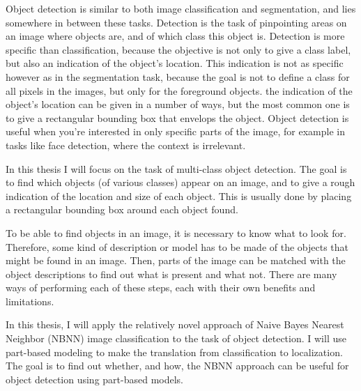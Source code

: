 \documentclass[a4paper,10pt]{article}
\begin{document}
Object detection is similar to both image classification and segmentation, and lies somewhere in between these tasks. Detection is the task of pinpointing areas on an image where objects are, and of which class this object is. Detection is more specific than classification, because the objective is not only to give a class label, but also an indication of the object's location. This indication is not as specific however as in the segmentation task, because the goal is not to define a class for all pixels in the images, but only for the foreground objects. the indication of the object's location can be given in a number of ways, but the most common one is to give a rectangular bounding box that envelops the object. Object detection is useful when you're interested in only specific parts of the image, for example in tasks like face detection, where the context is irrelevant. \todo{}


In this thesis I will focus on the task of multi-class object detection. The goal is to find which objects (of various classes) appear on an image, and to give a rough indication of the location and size of each object. This is usually done by placing a rectangular bounding box around each object found. 

To be able to find objects in an image, it is necessary to know what to look for. Therefore, some kind of description or model has to be made of the objects that might be found in an image. Then, parts of the image can be matched with the object descriptions to find out what is present and what not. There are many ways of performing each of these steps, each with their own benefits and limitations.

In this thesis, I will apply the relatively novel approach of Naive Bayes Nearest Neighbor (NBNN) image classification \cite{boiman2008defense}  to the task of object detection. I will use part-based modeling  to make the translation from classification to localization. The goal is to find out whether, and how, the NBNN approach can be useful for object detection using part-based models.
\end{document}

